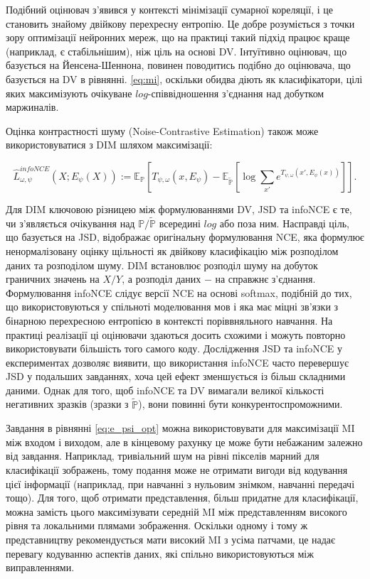 Подібний оцінювач з'явився у контексті мінімізації сумарної кореляції, і це становить знайому двійкову перехресну ентропію. Це добре розуміється з точки зору оптимізації нейронних мереж, що на практиці такий підхід працює краще (наприклад, є стабільнішим), ніж ціль на основі DV. Інтуїтивно оцінювач, що базується на Йенсена-Шеннона, повинен поводитись подібно до оцінювача, що базується на DV в рівнянні. \ref{eq:mi}, оскільки обидва діють як класифікатори, цілі яких максимізують очікуване $log$-співвідношення з'єднання над добутком маржиналів.

Оцінка контрастності шуму (Noise-Contrastive Estimation) також може використовуватися з DIM шляхом максимізації:

\begin{equation}\label{eq:dim}
\hat{L}_{\omega,\psi}^{infoNCE}(X; E_{\psi}(X)) := \mathbb{E_{P}}\left[T_{\psi,\omega}(x, E_{\psi}) - \mathbb{E_{\tilde{P}}}\left[\log{\sum_{x'}{e^{T_{\psi, \omega}(x', E_{\psi}(x))}}}\right]\right].
\end{equation}

\vspace{1.5em}

Для DIM ключовою різницею між формулюваннями DV, JSD та infoNCE є те, чи з'являється очікування над $\mathbb{P / \tilde{P}}$ всередині $log$ або поза ним. Насправді ціль, що базується на JSD, відображає оригінальну формулювання NCE, яка формулює ненормалізовану оцінку щільності як двійкову класифікацію між розподілом даних та розподілом шуму. DIM встановлює розподіл шуму на добуток граничних значень на $X / Y$, а розподіл даних $-$ на справжнє з'єднання. Формулювання infoNCE слідує версії NCE на основі softmax, подібній до тих, що використовуються у спільноті моделювання мов і яка має міцні зв'язки з бінарною перехресною ентропією в контексті поріввняльного навчання. На практиці реалізації ці оцінювачи здаються досить схожими і можуть повторно використовувати більшість того самого коду. Дослідження JSD та infoNCE у експериментах дозволяє виявити, що використання infoNCE часто перевершує JSD у подальших завданнях, хоча цей ефект зменшується із більш складними даними. Однак для того, щоб infoNCE та DV вимагали великої кількості негативних зразків (зразки з $\mathbb{\tilde{P}}$), вони повинні бути конкурентоспроможними.

Завдання в рівнянні \ref{eq:e_psi_opt}  можна використовувати для максимізації MI між входом і виходом, але в кінцевому рахунку це може бути небажаним залежно від завдання. Наприклад, тривіальний шум на рівні пікселів марний для класифікації зображень, тому подання може не отримати вигоди від кодування цієї інформації (наприклад, при навчанні з нульовим знімком, навчанні передачі тощо). Для того, щоб отримати представлення, більш придатне для класифікації, можна замість цього максимізувати середній MI між представленням високого рівня та локальними плямами зображення. Оскільки одному і тому ж представництву рекомендується мати високий MI з усіма патчами, це надає перевагу кодуванню аспектів даних, які спільно використовуються між виправленнями.

